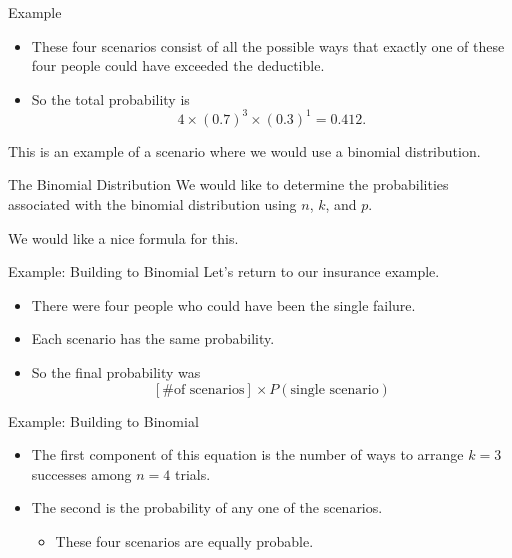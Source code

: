 \begin{frame}{Example}
    \begin{itemize}
        \item These four scenarios consist of all the possible ways that exactly one of these four people could have exceeded the deductible.
        \item So the total probability is 
            \[
                4 \times (0.7)^3\times (0.3)^1 = 0.412.
            \]
    \end{itemize}
    This is an example of a scenario where we would use a binomial distribution.
\end{frame}

\begin{frame}{The Binomial Distribution}
    We would like to determine the probabilities associated with the binomial distribution using $n$, $k$, and $p$. 
    
    \vspace{12pt}We would like a nice formula for this.
\end{frame}

\begin{frame}{Example: Building to Binomial}
    Let's return to our insurance example.
    \begin{itemize}
        \item There were four people who could have been the single failure.
        \item Each scenario has the same probability.
        \item So the final probability was
        \[
            [\text{\# of scenarios}] \times P (\text{single scenario})
        \]
    \end{itemize}
\end{frame}

\begin{frame}{Example: Building to Binomial}
    \begin{itemize}
        \item The first component of this equation is the number of ways to arrange $k = 3$ successes among $n = 4$ trials. 
        \item The second is the probability of any one of the scenarios.
        \begin{itemize}
            \item These four scenarios are equally probable.
        \end{itemize}
    \end{itemize}
\end{frame}

